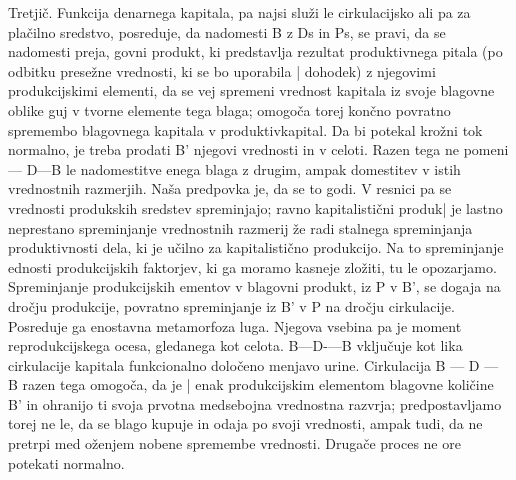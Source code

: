 \documentclass[kapital_02.tex]{subfiles}
\begin{document}
 Tretjič. Funkcija denarnega kapitala, pa najsi služi le cirkulacijsko ali pa za plačilno sredstvo, posreduje, da nadomesti B z Ds in Ps, se pravi, da se nadomesti preja, govni produkt, ki predstavlja rezultat produktivnega pitala (po odbitku presežne vrednosti, ki se bo uporabila | dohodek) z njegovimi produkcijskimi elementi, da se vej spremeni vrednost kapitala iz svoje blagovne oblike guj v tvorne elemente tega blaga; omogoča torej končno povratno spremembo blagovnega kapitala v produktivkapital. Da bi potekal krožni tok normalno, je treba prodati B' njegovi vrednosti in v celoti. Razen tega ne pomeni — D—B le nadomestitve enega blaga z drugim, ampak domestitev v istih vrednostnih razmerjih. Naša predpovka je, da se to godi. V resnici pa se vrednosti produkskih sredstev spreminjajo; ravno kapitalistični produk| je lastno neprestano spreminjanje vrednostnih razmerij že radi stalnega spreminjanja produktivnosti dela, ki je učilno za kapitalistično produkcijo. Na to spreminjanje ednosti produkcijskih faktorjev, ki ga moramo kasneje zložiti, tu le opozarjamo. Spreminjanje produkcijskih ementov v blagovni produkt, iz P v B', se dogaja na dročju produkcije, povratno spreminjanje iz B' v P na dročju cirkulacije. Posreduje ga enostavna metamorfoza luga. Njegova vsebina pa je moment reprodukcijskega ocesa, gledanega kot celota. B—D-—B vključuje kot lika cirkulacije kapitala funkcionalno določeno menjavo urine. Cirkulacija B — D — B razen tega omogoča, da je | enak produkcijskim elementom blagovne količine B' in ohranijo ti svoja prvotna medsebojna vrednostna razvrja; predpostavljamo torej ne le, da se blago kupuje in odaja po svoji vrednosti, ampak tudi, da ne pretrpi med oženjem nobene spremembe vrednosti. Drugače proces ne ore potekati normalno.
\end{document}
